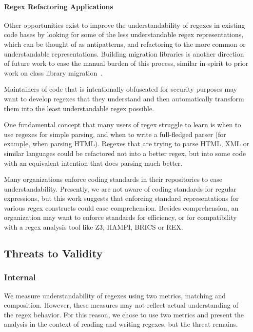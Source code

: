 \paragraph{Regex Refactoring Applications}
Other opportunities exist to improve the understandability of regexes in existing code bases by looking for some of the less understandable regex representations, which can be thought of as antipatterns, and refactoring to the more common or understandable representations. Building migration libraries is another direction of future work to ease the manual burden of this process, similar in spirit to prior work on class library migration~\cite{Balaban:2005:RSC:1103845.1094832}.

Maintainers of code that is intentionally obfuscated for security purposes may want to develop regexes that they understand and then automatically transform them into the least understandable regex possible.

One fundamental concept that many users of regex struggle to learn is when to use regexes for simple parsing, and when to write a full-fledged parser (for example, when parsing HTML).  Regexes that are trying to parse HTML, XML or similar languages could be refactored not into a better regex, but into some code with an equivalent intention that does parsing much better.

Many organizations enforce coding standards in their repositories to ease understandability.
Presently, we are not aware of coding standards for regular expressions, but this work suggests that enforcing standard representations for various regex constructs could ease comprehension.  Besides comprehension, an organization may want to enforce standards for efficiency, or for compatibility with a regex analysis tool like Z3, HAMPI, BRICS or REX.

\subsection{Threats to Validity}

\subsubsection{Internal}
We measure understandability of regexes using two metrics, matching and composition. However, these measures may not reflect actual understanding of the regex behavior. For this reason, we chose to use two metrics and present the analysis in the context of reading and writing regexes, but the threat remains.

